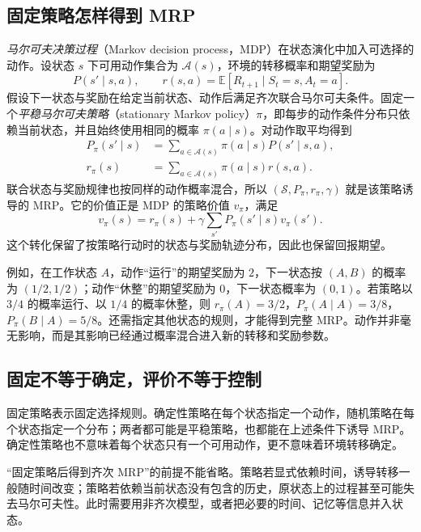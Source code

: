 \documentclass[UTF8,12pt,a4paper,fontset=fandol]{ctexart}
\begin{document}
\subsection{固定策略怎样得到 MRP}

\emph{马尔可夫决策过程}（Markov decision process，MDP）在状态演化中加入可选择的动作。设状态 $s$ 下可用动作集合为 $\mathcal A(s)$，环境的转移概率和期望奖励为
\[
  P(s'\mid s,a),\qquad
  r(s,a)=\mathbb E[R_{t+1}\mid S_t=s,A_t=a].
\]
假设下一状态与奖励在给定当前状态、动作后满足齐次联合马尔可夫条件。固定一个\emph{平稳马尔可夫策略}（stationary Markov policy）$\pi$，即每步的动作条件分布只依赖当前状态，并且始终使用相同的概率 $\pi(a\mid s)$。对动作取平均得到
\begin{equation}
  \begin{aligned}
    P_\pi(s'\mid s)&=\sum_{a\in\mathcal A(s)}\pi(a\mid s)P(s'\mid s,a),\\
    r_\pi(s)&=\sum_{a\in\mathcal A(s)}\pi(a\mid s)r(s,a).
  \end{aligned}
  \label{eq:mrp-policy-induced}
\end{equation}
联合状态与奖励规律也按同样的动作概率混合，所以 $(\mathcal S,P_\pi,r_\pi,\gamma)$ 就是该策略诱导的 MRP。它的价值正是 MDP 的策略价值 $v_\pi$，满足
\begin{equation}
  v_\pi(s)=r_\pi(s)+\gamma\sum_{s'}P_\pi(s'\mid s)v_\pi(s').
  \label{eq:mrp-policy-value}
\end{equation}
这个转化保留了按策略行动时的状态与奖励轨迹分布，因此也保留回报期望。

例如，在工作状态 $A$，动作“运行”的期望奖励为 $2$，下一状态按 $(A,B)$ 的概率为 $(1/2,1/2)$；动作“休整”的期望奖励为 $0$，下一状态概率为 $(0,1)$。若策略以 $3/4$ 的概率运行、以 $1/4$ 的概率休整，则 $r_\pi(A)=3/2$，$P_\pi(A\mid A)=3/8$，$P_\pi(B\mid A)=5/8$。还需指定其他状态的规则，才能得到完整 MRP。动作并非毫无影响，而是其影响已经通过概率混合进入新的转移和奖励参数。

\subsection{固定不等于确定，评价不等于控制}

固定策略表示固定选择规则。确定性策略在每个状态指定一个动作，随机策略在每个状态指定一个分布；两者都可能是平稳策略，也都能在上述条件下诱导 MRP。确定性策略也不意味着每个状态只有一个可用动作，更不意味着环境转移确定。

“固定策略后得到齐次 MRP”的前提不能省略。策略若显式依赖时间，诱导转移一般随时间改变；策略若依赖当前状态没有包含的历史，原状态上的过程甚至可能失去马尔可夫性。此时需要用非齐次模型，或者把必要的时间、记忆等信息并入状态。
\end{document}
